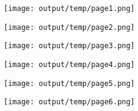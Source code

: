 \documentclass[a4paper]{article}
\begin{document}
\begin{center}
	\centering
	\texttt{[image: output/temp/page1.png]}
\end{center}

\newpage

\begin{center}
	\centering
	\texttt{[image: output/temp/page2.png]}
\end{center}

\newpage

\begin{center}
	\centering
	\texttt{[image: output/temp/page3.png]}
\end{center}

\newpage

\begin{center}
	\centering
	\texttt{[image: output/temp/page4.png]}
\end{center}

\newpage

\begin{center}
	\centering
	\texttt{[image: output/temp/page5.png]}
\end{center}

\newpage

\begin{center}
	\centering
	\texttt{[image: output/temp/page6.png]}
\end{center}
\end{document}
